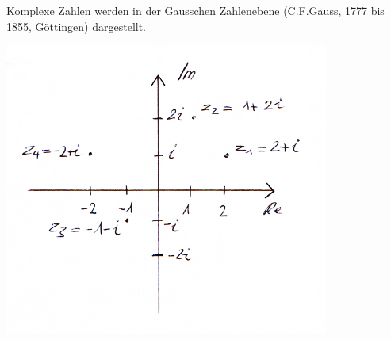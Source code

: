 \documentclass[a4paper,10pt]{report}
\begin{document}
Komplexe Zahlen werden in der Gausschen Zahlenebene (C.F.Gauss, 1777 bis 1855, Göttingen) dargestellt.
\begin{center}
	 \includegraphics[width=0.8\textwidth]{imgs/gaussZahlenebene.png}
\end{center}
\newpage
\end{document}
